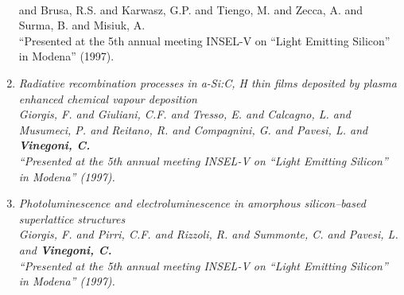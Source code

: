 \documentclass{resume}
\begin{document}
\begin{category}{~~}
\begin{enumerate}
and Brusa, R.S. and Karwasz, G.P. and Tiengo, M. and Zecca, A. and Surma, B. and Misiuk, A. \\ ``Presented at the 5th annual meeting INSEL-V on “Light Emitting Silicon” in Modena''  (1997). \item \it Radiative recombination processes in a-Si:C, H thin films deposited by plasma enhanced chemical vapour deposition \\ Giorgis, F. and Giuliani, C.F. and Tresso, E. and Calcagno, L. and Musumeci, P. and Reitano, R. and Compagnini, G. and Pavesi, L. and {\bf Vinegoni, C.} \\ ``Presented at the 5th annual meeting INSEL-V on “Light Emitting Silicon” in Modena''  (1997). \item \it Photoluminescence and electroluminescence in amorphous silicon–based superlattice structures \\ Giorgis, F. and Pirri, C.F. and Rizzoli, R. and Summonte, C.  and Pavesi, L. and {\bf Vinegoni, C.} \\ ``Presented at the 5th annual meeting INSEL-V on “Light Emitting Silicon” in Modena''  (1997). 

\end{enumerate}
\end{category}
\end{document}
